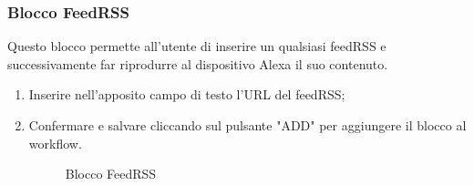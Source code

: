 \subsubsection{Blocco FeedRSS}
Questo blocco permette all'utente di inserire un qualsiasi feedRSS e successivamente far riprodurre al dispositivo Alexa il suo contenuto.
\begin{enumerate}
	\item Inserire nell'apposito campo di testo l'URL del feedRSS;
	\item Confermare e salvare cliccando sul pulsante "ADD" per aggiungere il blocco al workflow.
\begin{figure}[!ht]
	\centering
	\caption{Blocco FeedRSS}
\end{figure}
\end{enumerate}
\newpage


